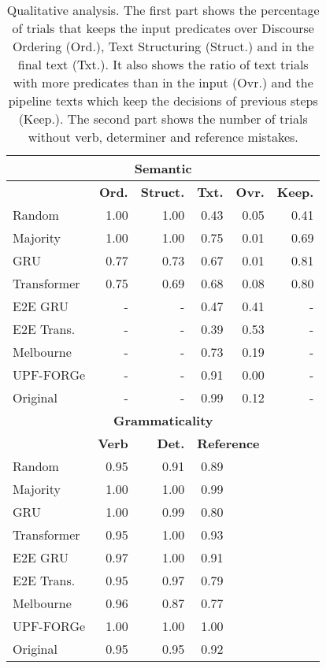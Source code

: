 \documentclass[11pt,a4paper]{article}
\begin{document}
\begin{table}
\centering
\footnotesize{
\begin{tabular}{l r r r r r}
\toprule
\multicolumn{6}{c}{\bf Semantic} \\
\midrule
& \textbf{Ord.} & \textbf{Struct.} & \textbf{Txt.} & \textbf{Ovr.} & \textbf{Keep.} \\
\midrule
Random      & 1.00 & 1.00 & 0.43 & 0.05 & 0.41 \\
Majority    & 1.00 & 1.00 & 0.75 & 0.01 & 0.69 \\
GRU         & 0.77 & 0.73 & 0.67 & 0.01 & 0.81 \\
Transformer & 0.75 & 0.69 & 0.68 & 0.08 & 0.80 \\
E2E GRU     & - & - & 0.47 & 0.41 & - \\ 
E2E Trans.  & - & - & 0.39 & 0.53 & - \\ 
Melbourne   & - & - & 0.73 & 0.19 & - \\ 
UPF-FORGe   & - & - & 0.91 & 0.00 & - \\ 
 Original   & - & - & 0.99 & 0.12 & - \\ 
\midrule
\multicolumn{6}{c}{\bf Grammaticality}\\
\midrule
& \textbf{Verb} & \textbf{Det.} & \multicolumn{3}{l}{\textbf{Reference}} \\
\midrule
Random          & 0.95 & 0.91 & 0.89 \\
Majority        & 1.00 & 1.00 & 0.99 \\
GRU             & 1.00 & 0.99 & 0.80 \\
Transformer     & 0.95 & 1.00 & 0.93 \\
E2E GRU         & 0.97 & 1.00 & 0.91 \\
E2E Trans.      & 0.95 & 0.97 & 0.79 \\
Melbourne       & 0.96 & 0.87 & 0.77 \\
UPF-FORGe       & 1.00 & 1.00 & 1.00 \\
Original        & 0.95 & 0.95 & 0.92 \\
\bottomrule
\end{tabular}
}
\caption{Qualitative analysis. The first part shows the percentage of trials that keeps the input predicates over Discourse Ordering (Ord.), Text Structuring (Struct.) and in the final text (Txt.). It also shows the ratio of text trials with more predicates than in the input (Ovr.) and the pipeline texts which keep the decisions of previous steps (Keep.). The second part shows the number of trials without verb, determiner and reference mistakes.}
\label{table:results3}
\end{table}
\end{document}

